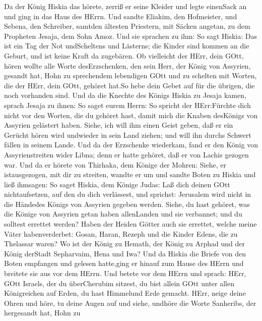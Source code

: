 Da der König Hiskia das hörete, zerriß er seine Kleider und
legte einenSack an und ging in das Haus des HErrn.  Und
sandte Eliakim, den Hofmeister, und Sebena, den Schreiber, samtden
ältesten Priestern, mit Säcken angetan, zu dem Propheten Jesaja, dem
Sohn Amoz.  Und sie sprachen zu ihm: So sagt Hiskia: Das ist
ein Tag der Not undScheltens und Lästerns; die Kinder sind kommen an die
Geburt, und ist keine Kraft da zugebären.  Ob vielleicht der
HErr, dein GOtt, hören wollte alle Worte desErzschenken, den sein Herr,
der König von Assyrien, gesandt hat, Hohn zu sprechendem lebendigen GOtt
und zu schelten mit Worten, die der HErr, dein GOtt, gehöret hat.So hebe
dein Gebet auf für die übrigen, die noch vorhanden sind. 
Und da die Knechte des Königs Hiskia zu Jesaja kamen, 
sprach Jesaja zu ihnen: So saget eurem Herrn: So spricht der
HErr:Fürchte dich nicht vor den Worten, die du gehöret hast, damit mich
die Knaben desKönigs von Assyrien gelästert haben.  Siehe,
ich will ihm einen Geist geben, daß er ein Gerücht hören wird undwieder
in sein Land ziehen; und will ihn durchs Schwert fällen in seinem Lande.
 Und da der Erzschenke wiederkam, fand er den König von
Assyrienstreiten wider Libna; denn er hatte gehöret, daß er von Lachis
gezogen war.  Und da er hörete von Thirhaka, dem Könige der
Mohren: Siehe, er istausgezogen, mit dir zu streiten, wandte er um und
sandte Boten zu Hiskia und ließ ihmsagen:  So saget Hiskia,
dem Könige Judas: Laß dich deinen GOtt nichtaufsetzen, auf den du dich
verlässest, und sprichst: Jerusalem wird nicht in die Händedes Königs
von Assyrien gegeben werden.  Siehe, du hast gehöret, was
die Könige von Assyrien getan haben allenLanden und sie verbannet; und
du solltest errettet werden?  Haben der Heiden Götter auch
sie errettet, welche meine Väter habenverderbet: Gosan, Haran, Rezeph
und die Kinder Edens, die zu Thelassar waren?  Wo ist der
König zu Hemath, der König zu Arphad und der König derStadt Sepharvaim,
Hena und Iwa?  Und da Hiskia die Briefe von den Boten
empfangen und gelesen hatte,ging er hinauf zum Hause des HErrn und
breitete sie aus vor dem HErrn.  Und betete vor dem HErrn
und sprach: HErr, GOtt Israels, der du überCherubim sitzest, du bist
allein GOtt unter allen Königreichen auf Erden, du hast Himmelund Erde
gemacht.  HErr, neige deine Ohren und höre, tu deine Augen
auf und siehe, undhöre die Worte Sanheribs, der hergesandt hat, Hohn zu
